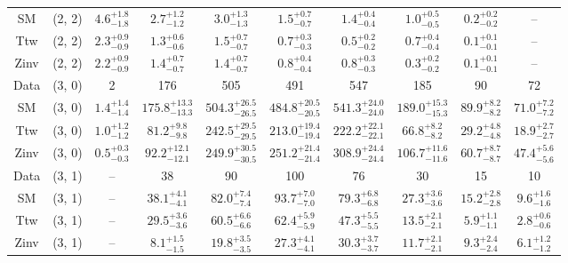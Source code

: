 \begin{table}[h!]
{\begin{tabular}{cccccccccc}
	SM & (2, 2) & $4.6^{+ 1.8 }_{- 1.8 }$ & $2.7^{+ 1.2 }_{- 1.2 }$ & $3.0^{+ 1.3 }_{- 1.3 }$ & $1.5^{+ 0.7 }_{- 0.7 }$ & $1.4^{+ 0.4 }_{- 0.4 }$ & $1.0^{+ 0.5 }_{- 0.5 }$ & $0.2^{+ 0.2 }_{- 0.2 }$ & -- \\[0.5ex] 
	Ttw & (2, 2) & $2.3^{+ 0.9 }_{- 0.9 }$ & $1.3^{+ 0.6 }_{- 0.6 }$ & $1.5^{+ 0.7 }_{- 0.7 }$ & $0.7^{+ 0.3 }_{- 0.3 }$ & $0.5^{+ 0.2 }_{- 0.2 }$ & $0.7^{+ 0.4 }_{- 0.4 }$ & $0.1^{+ 0.1 }_{- 0.1 }$ & -- \\[0.5ex] 
	Zinv & (2, 2) & $2.2^{+ 0.9 }_{- 0.9 }$ & $1.4^{+ 0.7 }_{- 0.7 }$ & $1.4^{+ 0.7 }_{- 0.7 }$ & $0.8^{+ 0.4 }_{- 0.4 }$ & $0.8^{+ 0.3 }_{- 0.3 }$ & $0.3^{+ 0.2 }_{- 0.2 }$ & $0.1^{+ 0.1 }_{- 0.1 }$ & -- \\[0.5ex] 
	Data & (3, 0) & 2 & 176 & 505 & 491 & 547 & 185 & 90 & 72 \\[0.5ex] 
	SM & (3, 0) & $1.4^{+ 1.4 }_{- 1.4 }$ & $175.8^{+ 13.3 }_{- 13.3 }$ & $504.3^{+ 26.5 }_{- 26.5 }$ & $484.8^{+ 20.5 }_{- 20.5 }$ & $541.3^{+ 24.0 }_{- 24.0 }$ & $189.0^{+ 15.3 }_{- 15.3 }$ & $89.9^{+ 8.2 }_{- 8.2 }$ & $71.0^{+ 7.2 }_{- 7.2 }$ \\[0.5ex] 
	Ttw & (3, 0) & $1.0^{+ 1.2 }_{- 1.2 }$ & $81.2^{+ 9.8 }_{- 9.8 }$ & $242.5^{+ 29.5 }_{- 29.5 }$ & $213.0^{+ 19.4 }_{- 19.4 }$ & $222.2^{+ 22.1 }_{- 22.1 }$ & $66.8^{+ 8.2 }_{- 8.2 }$ & $29.2^{+ 4.8 }_{- 4.8 }$ & $18.9^{+ 2.7 }_{- 2.7 }$ \\[0.5ex] 
	Zinv & (3, 0) & $0.5^{+ 0.3 }_{- 0.3 }$ & $92.2^{+ 12.1 }_{- 12.1 }$ & $249.9^{+ 30.5 }_{- 30.5 }$ & $251.2^{+ 21.4 }_{- 21.4 }$ & $308.9^{+ 24.4 }_{- 24.4 }$ & $106.7^{+ 11.6 }_{- 11.6 }$ & $60.7^{+ 8.7 }_{- 8.7 }$ & $47.4^{+ 5.6 }_{- 5.6 }$ \\[0.5ex] 
	Data & (3, 1) & -- & 38 & 90 & 100 & 76 & 30 & 15 & 10 \\[0.5ex] 
	SM & (3, 1) & -- & $38.1^{+ 4.1 }_{- 4.1 }$ & $82.0^{+ 7.4 }_{- 7.4 }$ & $93.7^{+ 7.0 }_{- 7.0 }$ & $79.3^{+ 6.8 }_{- 6.8 }$ & $27.3^{+ 3.6 }_{- 3.6 }$ & $15.2^{+ 2.8 }_{- 2.8 }$ & $9.6^{+ 1.6 }_{- 1.6 }$ \\[0.5ex] 
	Ttw & (3, 1) & -- & $29.5^{+ 3.6 }_{- 3.6 }$ & $60.5^{+ 6.6 }_{- 6.6 }$ & $62.4^{+ 5.9 }_{- 5.9 }$ & $47.3^{+ 5.5 }_{- 5.5 }$ & $13.5^{+ 2.1 }_{- 2.1 }$ & $5.9^{+ 1.1 }_{- 1.1 }$ & $2.8^{+ 0.6 }_{- 0.6 }$ \\[0.5ex] 
	Zinv & (3, 1) & -- & $8.1^{+ 1.5 }_{- 1.5 }$ & $19.8^{+ 3.5 }_{- 3.5 }$ & $27.3^{+ 4.1 }_{- 4.1 }$ & $30.3^{+ 3.7 }_{- 3.7 }$ & $11.7^{+ 2.1 }_{- 2.1 }$ & $9.3^{+ 2.4 }_{- 2.4 }$ & $6.1^{+ 1.2 }_{- 1.2 }$ \\[0.5ex] 

\end{tabular}}
\end{table}
